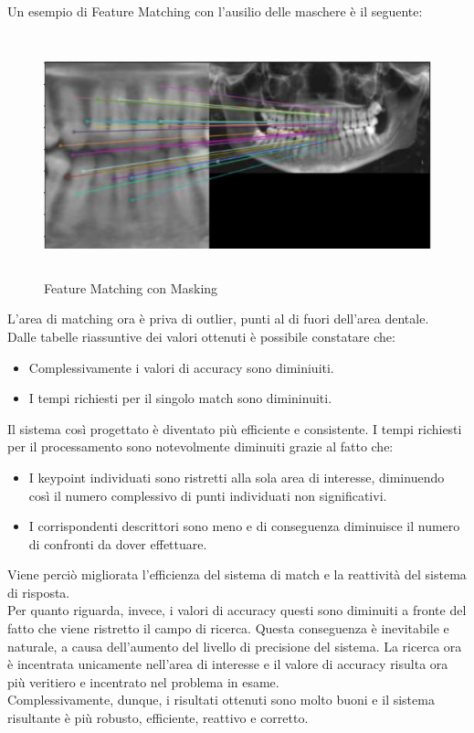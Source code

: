 \documentclass[12pt,a4paper,openright,twoside]{book}
\begin{document}
Un esempio di Feature Matching con l'ausilio delle maschere è il seguente:
\begin{figure}[H]
	\centering
	\includegraphics[width=15cm,height=7cm]{figures/matchmask.pdf}
    	\caption{Feature Matching con Masking}
	\label{fig:matchmask}
\end{figure}

L'area di matching ora è priva di outlier, punti al di fuori dell'area dentale.\\
Dalle tabelle riassuntive dei valori ottenuti è possibile constatare che:
\begin{itemize}
\item Complessivamente i valori di accuracy sono diminiuiti.
\item I tempi richiesti per il singolo match sono dimininuiti.
\end{itemize}

Il sistema così progettato è diventato più efficiente e consistente. I tempi richiesti per il processamento sono notevolmente diminuiti grazie al fatto che:
\begin{itemize}
\item I keypoint individuati sono ristretti alla sola area di interesse, diminuendo così il numero complessivo di punti individuati non significativi.
\item I corrispondenti descrittori sono meno e di conseguenza diminuisce il numero di confronti da dover effettuare.
\end{itemize}
Viene perciò migliorata l'efficienza del sistema di match e la reattività del sistema di risposta.\\

Per quanto riguarda, invece, i valori di accuracy questi sono diminuiti a fronte del fatto che viene ristretto il campo di ricerca. Questa conseguenza è inevitabile e naturale, a causa dell'aumento del livello di precisione del sistema. La ricerca ora è incentrata unicamente nell'area di interesse e il valore di accuracy risulta ora più veritiero e incentrato nel problema in esame.\\
Complessivamente, dunque, i risultati ottenuti sono molto buoni e il sistema risultante è più robusto, efficiente, reattivo e corretto.
\end{document}
